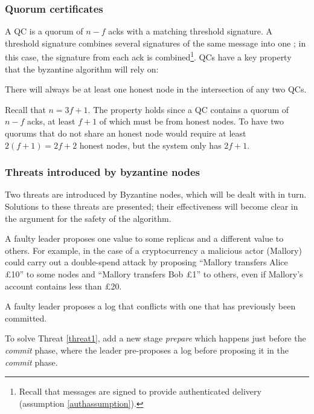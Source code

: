 \subsubsection{Quorum certificates}

A QC is a quorum of $n - f$ acks with a matching threshold signature. A threshold signature combines several signatures of the same message into one \cite{shoupPracticalThresholdSignatures2000, cachinRandomOraclesConstantinople2005}; in this case, the signature from each ack is combined\footnote{Recall that messages are signed to provide authenticated delivery (assumption \ref{authassumption}).}. QCs have a key property that the byzantine algorithm will rely on:

\begin{property} \label{qcproperty}
There will always be at least one honest node in the intersection of any two QCs.
\end{property}

Recall that $n = 3f + 1$. The property holds since a QC contains a quorum of $n - f$ acks, at least $f + 1$ of which must be from honest nodes. To have two quorums that do not share an honest node would require at least $2(f + 1) = 2f + 2$ honest nodes, but the system only has $2f + 1$.

\subsubsection{Threats introduced by byzantine nodes}
Two threats are introduced by Byzantine nodes, which will be dealt with in turn. Solutions to these threats are presented; their effectiveness will become clear in the argument for the safety of the algorithm.

\begin{threat}[Equivocation] \label{threat1}
A faulty leader proposes one value to some replicas and a different value to others. For example, in the case of a cryptocurrency a malicious actor (Mallory) could carry out a double-spend attack by proposing ``Mallory transfers Alice £10'' to some nodes and ``Mallory transfers Bob £1'' to others, even if Mallory's account contains less than £20.
\end{threat}

\begin{threat} \label{threat2}
A faulty leader proposes a log that conflicts with one that has previously been committed.
\end{threat}

To solve Threat \ref{threat1}, add a new stage \textit{prepare} which happens just before the \textit{commit} phase, where the leader pre-proposes a log before proposing it in the \textit{commit} phase.

